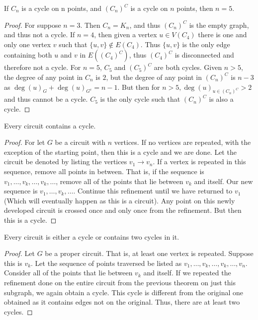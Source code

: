     \begin{theorem}
    If $C_n$ is a cycle on n points, and $(C_n)^C$ is a cycle on $n$ points, then $n = 5$.
    \end{theorem}
    \begin{proof}
    For suppose $n=3$. Then $C_n = K_n$, and thus $(C_n)^C$ is the empty graph, and thus not a cycle. If $n = 4$, then given a vertex $u\in V(C_4)$ there is one and only one vertex $v$ such that $\{u,v\} \notin E(C_4)$. Thus $\{u,v\}$ is the only edge containing both $u$ and $v$ in $E((C_4)^C)$, thus $(C_4)^C$ is disconnected and therefore not a cycle. For $n=5$, $C_5$ and $(C_5)^C$ are both cycles. Given $n>5$, the degree of any point in $C_{n}$ is $2$, but the degree of any point in $(C_n)^C$ is $n-3$ as $\deg(u)_G + \deg(u)_{G^c} = n-1$. But then for $n>5, \deg(u)_{u\in (C_n)^C} > 2$ and thus cannot be a cycle. $C_5$ is the only cycle such that $(C_n)^C$ is also a cycle.
    \end{proof}
    \begin{theorem}
    Every circuit contains a cycle.
    \end{theorem}
    \begin{proof}
    For let $G$ be a circuit with $n$ vertices. If no vertices are repeated, with the exception of the starting point, then this is a cycle and we are done. Let the circuit be denoted by listing the vertices $v_1 \rightarrow v_n$. If a vertex is repeated in this sequence, remove all points in between. That is, if the sequence is $v_1,\hdots, v_k,\hdots, v_k, \hdots$, remove all of the points that lie between $v_k$ and itself. Our new sequence is $v_1, \hdots, v_k, \hdots$. Continue this refinement until we have returned to $v_1$ (Which will eventually happen as this is a circuit). Any point on this newly developed circuit is crossed once and only once from the refinement. But then this is a cycle.
    \end{proof}
    \begin{theorem}
    Every circuit is either a cycle or contains two cycles in it.
    \end{theorem}
    \begin{proof}
    Let $G$ be a proper circuit. That is, at least one vertex is repeated. Suppose this is $v_k$. Let the sequence of points traversed be listed as $v_1,\hdots, v_k, \hdots,v_k, \hdots, v_n$. Consider all of the points that lie between $v_k$ and itself. If we repeated the refinement done on the entire circuit from the previous theorem on just this subgraph, we again obtain a cycle. This cycle is different from the original one obtained as it contains edges not on the original. Thus, there are at least two cycles.
    \end{proof}
